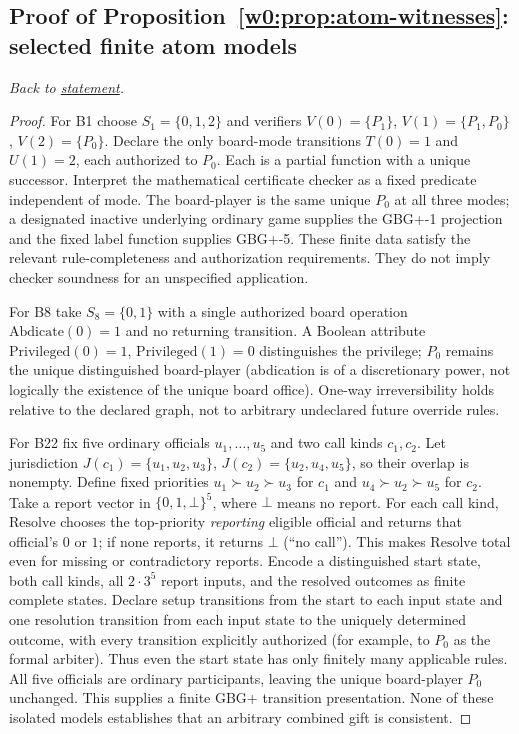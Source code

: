 \documentclass[11pt,letterpaper]{article}
\theoremstyle{definition}\newtheorem{definition}[theorem]{Definition}\newtheorem{example}[theorem]{Example}
\theoremstyle{remark}\newtheorem{remark}[theorem]{Remark}
\begin{document}
\subsection{Proof of Proposition~\ref{w0:prop:atom-witnesses}: selected finite atom models}\label{w0:pr:atom-witnesses}
\textit{Back to \hyperref[w0:prop:atom-witnesses]{statement}.}
\begin{proof}
For B1 choose $S_1=\{0,1,2\}$ and verifiers $V(0)=\{P_1\}$, $V(1)=\{P_1,P_0\}$, $V(2)=\{P_0\}$. Declare the only board-mode transitions $T(0)=1$ and $U(1)=2$, each authorized to $P_0$. Each is a partial function with a unique successor. Interpret the mathematical certificate checker as a fixed predicate independent of mode. The board-player is the same unique $P_0$ at all three modes; a designated inactive underlying ordinary game supplies the GBG+-1 projection and the fixed label function supplies GBG+-5. These finite data satisfy the relevant rule-completeness and authorization requirements. They do not imply checker soundness for an unspecified application.

For B8 take $S_8=\{0,1\}$ with a single authorized board operation $\mathrm{Abdicate}(0)=1$ and no returning transition. A Boolean attribute $\mathrm{Privileged}(0)=1$, $\mathrm{Privileged}(1)=0$ distinguishes the privilege; $P_0$ remains the unique distinguished board-player (abdication is of a discretionary power, not logically the existence of the unique board office). One-way irreversibility holds relative to the declared graph, not to arbitrary undeclared future override rules.

For B22 fix five ordinary officials $u_1,\ldots,u_5$ and two call kinds $c_1,c_2$. Let jurisdiction $J(c_1)=\{u_1,u_2,u_3\}$, $J(c_2)=\{u_2,u_4,u_5\}$, so their overlap is nonempty. Define fixed priorities $u_1\succ u_2\succ u_3$ for $c_1$ and $u_4\succ u_2\succ u_5$ for $c_2$. Take a report vector in $\{0,1,\bot\}^5$, where $\bot$ means no report. For each call kind, $\mathrm{Resolve}$ chooses the top-priority \emph{reporting} eligible official and returns that official's $0$ or $1$; if none reports, it returns $\bot$ (``no call''). This makes $\mathrm{Resolve}$ total even for missing or contradictory reports. Encode a distinguished start state, both call kinds, all $2\cdot3^5$ report inputs, and the resolved outcomes as finite complete states. Declare setup transitions from the start to each input state and one resolution transition from each input state to the uniquely determined outcome, with every transition explicitly authorized (for example, to $P_0$ as the formal arbiter). Thus even the start state has only finitely many applicable rules. All five officials are ordinary participants, leaving the unique board-player $P_0$ unchanged. This supplies a finite GBG+ transition presentation. None of these isolated models establishes that an arbitrary combined gift is consistent.
\end{proof}
\end{document}
